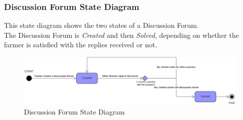 \subsubsection{Discussion Forum State Diagram}
This state diagram shows the two states of a Discussion Forum.\\
The Discussion Forum is \textit{Created} and then \textit{Solved}, depending on whether the farmer is satisfied with the replies received or not.
\begin{figure}[h!]
  \includegraphics[width=\textwidth,height=\textheight,keepaspectratio]{./Images/State Chart DiscussionForum.png}
  \caption{Discussion Forum State Diagram}
\end{figure}

\newpage